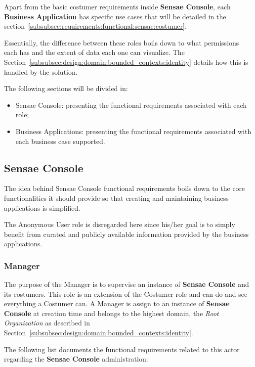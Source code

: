Apart from the basic costumer requirements inside \textbf{Sensae Console}, each \textbf{Business Application} has specific use cases that will be detailed in the section~\ref{subsubsec:requirements:functional:sensae:costumer}.

Essentially, the difference between these roles boils down to what permissions each has and the extent of data each one can visualize. The Section~\ref{subsubsec:design:domain:bounded_contexts:identity} details how this is handled by the solution.

The following sections will be divided in:

\begin{itemize}
    \item Sensae Console: presenting the functional requirements associated with each role;
    \item Business Applications: presenting the functional requirements associated with each business case supported.
\end{itemize}

\subsection{Sensae Console}
\label{subsec:requirements:functional:sensae}

The idea behind Sensae Console functional requirements boils down to the core functionalities it should provide so that creating and maintaining business applications is simplified.

The Anonymous User role is disregarded here since his/her goal is to simply benefit from curated and publicly available information provided by the business applications.

\subsubsection{Manager}
\label{subsubsec:requirements:functional:sensae:manager}

The purpose of the Manager is to supervise an instance of \textbf{Sensae Console} and its costumers. This role is an extension of the Costumer role and can do and see everything a Costumer can. A Manager is assign to an instance of \textbf{Sensae Console} at creation time and belongs to the highest domain, the \textit{Root Organization} as described in Section~\ref{subsubsec:design:domain:bounded_contexts:identity}.

The following list documents the functional requirements related to this actor regarding the \textbf{Sensae Console} administration:

